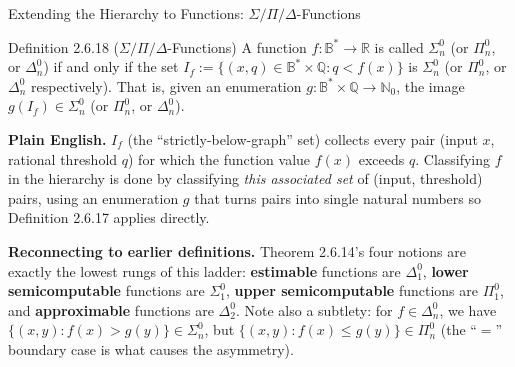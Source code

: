 \documentclass[aspectratio=169,10pt]{beamer}
\newcommand{\B}{\mathbb{B}}
\newcommand{\N}{\mathbb{N}}
\newcommand{\R}{\mathbb{R}}
\newcommand{\Q}{\mathbb{Q}}
\begin{document}
\begin{frame}{Extending the Hierarchy to Functions: $\Sigma/\Pi/\Delta$-Functions}
  \begin{block}{Definition 2.6.18 ($\Sigma/\Pi/\Delta$-Functions)}
    A function $f : \B^{*} \to \R$ is called $\Sigma_n^0$ (or $\Pi_n^0$, or
    $\Delta_n^0$) if and only if the set
    $I_f := \{(x,q) \in \B^{*} \times \Q : q < f(x)\}$ is $\Sigma_n^0$ (or
    $\Pi_n^0$, or $\Delta_n^0$ respectively). That is, given an enumeration
    $g : \B^{*} \times \Q \to \N_0$, the image $g(I_f) \in \Sigma_n^0$ (or
    $\Pi_n^0$, or $\Delta_n^0$).
  \end{block}
  \textbf{Plain English.} $I_f$ (the ``strictly-below-graph'' set) collects
  every pair (input $x$, rational threshold $q$) for which the function value
  $f(x)$ exceeds $q$. Classifying $f$ in the hierarchy is done by classifying
  \emph{this associated set} of (input, threshold) pairs, using an
  enumeration $g$ that turns pairs into single natural numbers so
  Definition 2.6.17 applies directly.

  \vspace{2mm}
  \textbf{Reconnecting to earlier definitions.} Theorem 2.6.14's four notions
  are exactly the lowest rungs of this ladder: \textbf{estimable} functions
  are $\Delta_1^0$, \textbf{lower semicomputable} functions are $\Sigma_1^0$,
  \textbf{upper semicomputable} functions are $\Pi_1^0$, and
  \textbf{approximable} functions are $\Delta_2^0$. Note also a subtlety: for
  $f \in \Delta_n^0$, we have $\{(x,y) : f(x) > g(y)\} \in \Sigma_n^0$, but
  $\{(x,y) : f(x) \leq g(y)\} \in \Pi_n^0$ (the ``$=$'' boundary case is what
  causes the asymmetry).
\end{frame}
\end{document}
